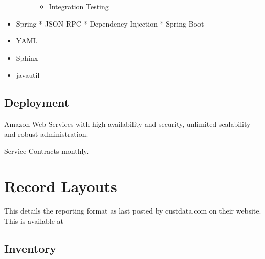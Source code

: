 \documentclass[letterpaper,10pt,english]{sphinxmanual}
\begin{document}
\begin{itemize}
\begin{description}
\begin{itemize}
\item {} 
Integration Testing

\end{itemize}

\end{description}

\item {} 
Spring
* JSON RPC
* Dependency Injection
* Spring Boot

\item {} 
YAML

\item {} 
Sphinx

\item {} 
javautil

\end{itemize}


\subsection{Deployment}
\label{\detokenize{Technologies:deployment}}
Amazon Web Services with high availability and security, unlimited scalability and robust administration.

Service Contracts monthly.


\section{Record Layouts}
\label{\detokenize{cds_record_layout:record-layouts}}\label{\detokenize{cds_record_layout::doc}}
This details the reporting format as last posted by custdata.com
on their website.  This is available at

\begin{sphinxVerbatim}[commandchars=\\\{\}]
\end{sphinxVerbatim}


\subsection{Inventory}
\label{\detokenize{cds_record_layout:inventory}}
\end{document}
